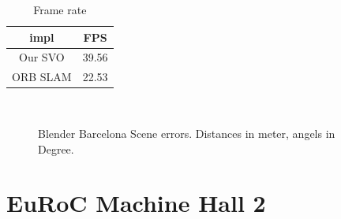 \documentclass[11pt,a4paper,titlepage,oneside]{report}
\begin{document}
\begin{table}[H]
  \centering
  \begin{tabular}{|c|c|}
  impl & FPS\\
  \hline
  Our SVO & 39.56\\
  ORB SLAM & 22.53
\end{tabular}
\caption{Frame rate}
\label{tab:barcelona_fps}
\end{table}


\begin{figure}[H]
  \\
  \caption{Blender Barcelona Scene errors. Distances in meter, angels in Degree.}\label{fig:blender_barcelona_diff}
\end{figure}

\section{EuRoC Machine Hall 2}
\end{document}
